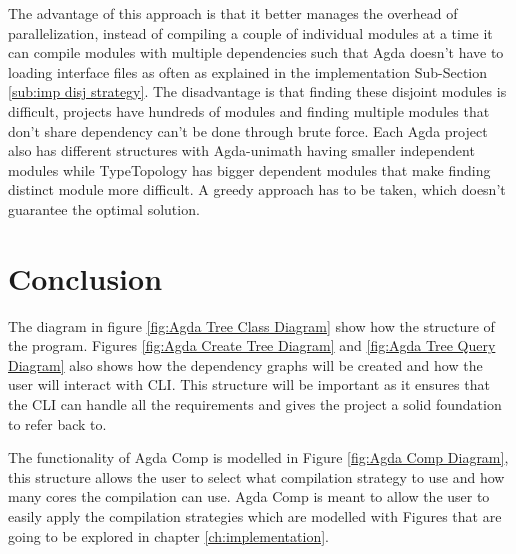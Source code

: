 The advantage of this approach is that it better manages the overhead of
parallelization, instead of compiling a couple of individual modules at a time
it can compile modules with multiple dependencies such that Agda doesn't have
to loading interface files as often as explained in the implementation
Sub-Section \ref{sub:imp disj strategy}. The disadvantage is that finding these
disjoint modules is difficult, projects  have hundreds of modules and finding
multiple modules that don't share dependency can't be done through brute force.
Each Agda project also has different structures with Agda-unimath having
smaller independent modules while TypeTopology has bigger dependent modules
that make finding distinct module more difficult. A greedy approach has to be
taken, which doesn't guarantee the optimal solution.



\pagebreak

\section{Conclusion}

The diagram in figure \ref{fig:Agda Tree Class Diagram} show how the structure
of the program. Figures \ref{fig:Agda Create Tree Diagram} and \ref{fig:Agda
Tree Query Diagram} also shows how the dependency graphs will be created and
how the user will interact with CLI. This structure will be important as it
ensures that the CLI can handle all the requirements and gives the project a
solid foundation to refer back to. 

The functionality of Agda Comp is modelled in Figure \ref{fig:Agda Comp
Diagram}, this structure allows the user to select what compilation strategy to
use and how many cores the compilation can use. Agda Comp is meant to allow the
user to easily apply the compilation strategies which are modelled with Figures that are going to be explored
in chapter \ref{ch:implementation}.

%
